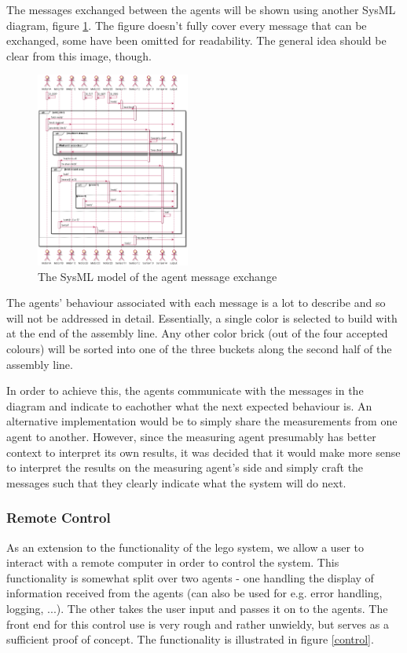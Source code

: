\documentclass[conference]{IEEEtran}
\begin{document}
The messages exchanged between the agents will be shown using another SysML\cite{sysml} diagram, figure \ref{comms}. The figure doesn't fully cover every message that can be exchanged, some have been omitted for readability. The general idea should be clear from this image, though. 

\begin{figure}[htbp]
\centerline{\includegraphics[width=0.45\textwidth]{sysml/communications.png}}
\caption{The SysML\cite{sysml} model of the agent message exchange}
\label{comms}
\end{figure}

The agents' behaviour associated with each message is a lot to describe and so will not be addressed in detail. Essentially, a single color is selected to build with at the end of the assembly line. Any other color brick (out of the four accepted colours) will be sorted into one of the three buckets along the second half of the assembly line.

In order to achieve this, the agents communicate with the messages in the diagram and indicate to eachother what the next expected behaviour is. An alternative implementation would be to simply share the measurements from one agent to another. However, since the measuring agent presumably has better context to interpret its own results, it was decided that it would make more sense to interpret the results on the measuring agent's side and simply craft the messages such that they clearly indicate what the system will do next.

\subsubsection{Remote Control}

As an extension to the functionality of the lego system, we allow a user to interact with a remote computer in order to control the system. This functionality is somewhat split over two agents - one handling the display of information received from the agents (can also be used for e.g. error handling, logging, ...). The other takes the user input and passes it on to the agents. The front end for this control use is very rough and rather unwieldy, but serves as a sufficient proof of concept. The functionality is illustrated in figure \ref{control}. 
\end{document}
